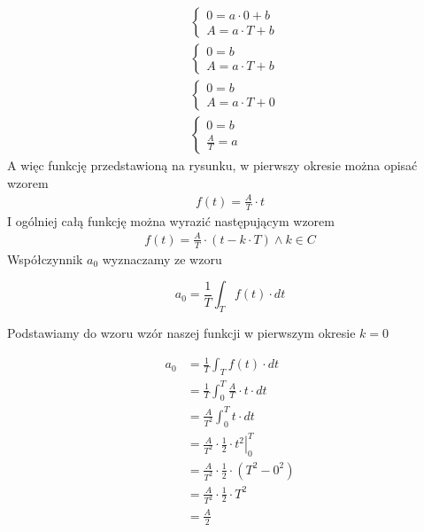 \begin{task}
\begin{align*}
&\left\{\begin{matrix}
0 = a\cdot 0 +b\\ 
A = a\cdot T +b
\end{matrix}\right. \\
&\left\{\begin{matrix}
0 = b\\ 
A = a\cdot T +b
\end{matrix}\right. \\
&\left\{\begin{matrix}
0 = b\\ 
A = a\cdot T +0
\end{matrix}\right. \\
&\left\{\begin{matrix}
0 = b\\ 
\frac{A}{T} = a
\end{matrix}\right.
\end{align*}
A więc funkcję przedstawioną na rysunku, w pierwszy okresie można opisać wzorem
\begin{align*}
f(t) = \frac{A}{T}\cdot t
\end{align*}
I ogólniej całą funkcję można wyrazić następującym wzorem
\begin{align*}
f(t) = \frac{A}{T}\cdot \left(t-k\cdot T\right) \wedge k \in C
\end{align*}
Współczynnik $a_0$ wyznaczamy ze wzoru

\begin{equation}
a_0=\frac{1}{T}\int_{T}f(t) \cdot dt
\end{equation}

Podstawiamy do wzoru wzór naszej funkcji w pierwszym okresie $k=0$

\begin{align*}
a_0&=\frac{1}{T}\int_{T}f(t) \cdot dt\\
&=\frac{1}{T}\int_{0}^{T} \frac{A}{T}\cdot t \cdot dt\\
&=\frac{A}{T^2}\int_{0}^{T} t \cdot dt\\
&=\frac{A}{T^2}\cdot \left. \frac{1}{2}\cdot t^2 \right|_{0}^{T}\\
&=\frac{A}{T^2}\cdot \frac{1}{2}\cdot \left( T^2 -0^2 \right)\\
&=\frac{A}{T^2}\cdot \frac{1}{2}\cdot T^2\\
&=\frac{A}{2}\\
\end{align*}


\end{task}
